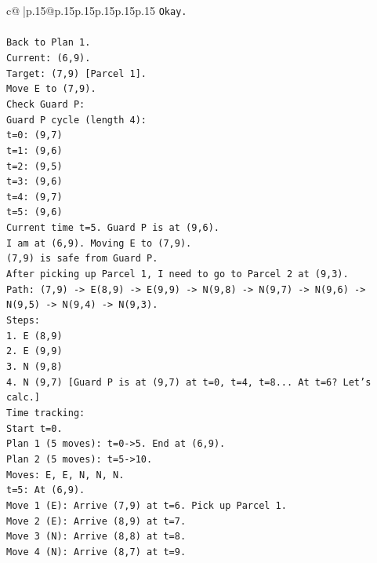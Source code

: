 \documentclass{article}
\begin{document}
{\begin{supertabular}{c@{$\;$}|p{.15\linewidth}@{}p{.15\linewidth}p{.15\linewidth}p{.15\linewidth}p{.15\linewidth}p{.15\linewidth}}
{{{\texttt{Okay.} \\
\\ 
\texttt{Back to Plan 1.} \\
\texttt{Current: (6,9).} \\
\texttt{Target: (7,9) {[}Parcel 1{]}.} \\
\texttt{Move E to (7,9).} \\
\texttt{Check Guard P:} \\
\texttt{Guard P cycle (length 4):} \\
\texttt{t=0: (9,7)} \\
\texttt{t=1: (9,6)} \\
\texttt{t=2: (9,5)} \\
\texttt{t=3: (9,6)} \\
\texttt{t=4: (9,7)} \\
\texttt{t=5: (9,6)} \\
\texttt{Current time t=5. Guard P is at (9,6).} \\
\texttt{I am at (6,9). Moving E to (7,9).} \\
\texttt{(7,9) is safe from Guard P.} \\
\texttt{After picking up Parcel 1, I need to go to Parcel 2 at (9,3).} \\
\texttt{Path: (7,9) {-}> E(8,9) {-}> E(9,9) {-}> N(9,8) {-}> N(9,7) {-}> N(9,6) {-}> N(9,5) {-}> N(9,4) {-}> N(9,3).} \\
\texttt{Steps:} \\
\texttt{1. E (8,9)} \\
\texttt{2. E (9,9)} \\
\texttt{3. N (9,8)} \\
\texttt{4. N (9,7) {[}Guard P is at (9,7) at t=0, t=4, t=8... At t=6? Let's calc.{]}} \\
\texttt{Time tracking:} \\
\texttt{Start t=0.} \\
\texttt{Plan 1 (5 moves): t=0{-}>5. End at (6,9).} \\
\texttt{Plan 2 (5 moves): t=5{-}>10.} \\
\texttt{Moves: E, E, N, N, N.} \\
\texttt{t=5: At (6,9).} \\
\texttt{Move 1 (E): Arrive (7,9) at t=6. Pick up Parcel 1.} \\
\texttt{Move 2 (E): Arrive (8,9) at t=7.} \\
\texttt{Move 3 (N): Arrive (8,8) at t=8.} \\
\texttt{Move 4 (N): Arrive (8,7) at t=9.} \\
}}}
\end{supertabular}}
\end{document}
